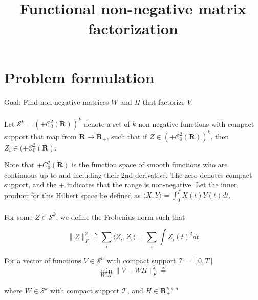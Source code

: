 \documentclass{amsart}
\title{Functional non-negative matrix factorization}
\begin{document}
  \maketitle

  \section{Problem formulation}

  \paragraph{}

  Goal: Find non-negative matrices $W$ and $H$ that factorize $V$.

  \paragraph{}

  Let $\mathcal{S}^k = (+\mathcal{C}_0^2(\mathbf{R}))^k$ denote a set of $k$ non-negative functions with compact support that map from $\mathbf{R} \rightarrow \mathbf{R}_+$, such that if $Z \in (+\mathcal{C}_0^2(\mathbf{R}))^k$, then $Z_i \in (+\mathcal{C}_0^2(\mathbf{R})$.

  Note that $+C_0^2(\mathbf{R})$ is the function space of smooth functions who are continuous up to and including their 2nd derivative. The zero denotes compact support, and the + indicates that the range is non-negative. Let the inner product for this Hilbert space be defined as $\langle X, Y \rangle = \int_0^T X(t) Y(t) dt$.

  \paragraph{}

  For some $Z \in \mathcal{S}^k$, we define the Frobenius norm such that

  \[
  \| Z \|_F^2 \triangleq \sum_i \langle Z_i, Z_i \rangle = \sum_{i} \int Z_i(t)^2 dt
  \]

  For a vector of functions $V \in \mathcal{S}^n$ with compact support $\mathcal{T} = [0, T]$
  \[
  \min_{W,H} \|V - W H\|_F^2 \triangleq
  \]

  where $W \in \mathcal{S}^k$ with compact support $\mathcal{T}$, and $H \in \mathbf{R}_+^{k \text{ x } n}$

  \paragraph{}
\end{document}

